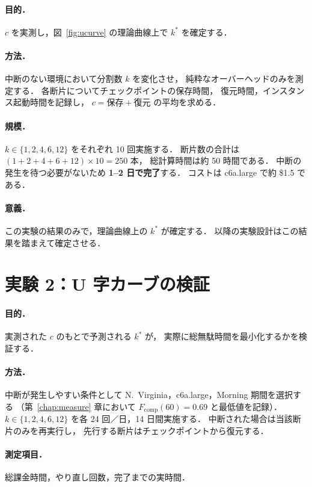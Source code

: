 \documentclass[11pt,a4paper]{ltjsreport}
\newcommand{\Fcomp}{F_{\mathrm{comp}}}
\begin{document}
\paragraph{目的．}
$c$ を実測し，図~\ref{fig:ucurve} の理論曲線上で
$k^{*}$ を確定する．

\paragraph{方法．}
中断のない環境において分割数 $k$ を変化させ，
純粋なオーバーヘッドのみを測定する．
各断片についてチェックポイントの保存時間，
復元時間，インスタンス起動時間を記録し，
$c = \text{保存} + \text{復元}$ の平均を求める．

\paragraph{規模．}
$k \in \{1,2,4,6,12\}$ をそれぞれ 10 回実施する．
断片数の合計は $(1+2+4+6+12)\times 10 = 250$ 本，
総計算時間は約 50 時間である．
中断の発生を待つ必要がないため \textbf{1--2 日で完了}する．
コストは c6a.large で約 \$1.5 である．

\paragraph{意義．}
この実験の結果のみで，理論曲線上の $k^{*}$ が確定する．
以降の実験設計はこの結果を踏まえて確定させる．

\section{実験 2：U 字カーブの検証}

\paragraph{目的．}
実測された $c$ のもとで予測される $k^{*}$ が，
実際に総無駄時間を最小化するかを検証する．

\paragraph{方法．}
中断が発生しやすい条件として
N.~Virginia，c6a.large，Morning 期間を選択する
（第~\ref{chap:measure} 章において $\Fcomp(60) = 0.69$ と最低値を記録）．
$k \in \{1,2,4,6,12\}$ を各 24 回／日，14 日間実施する．
中断された場合は当該断片のみを再実行し，
先行する断片はチェックポイントから復元する．

\paragraph{測定項目．}
総課金時間，やり直し回数，完了までの実時間．
\end{document}

